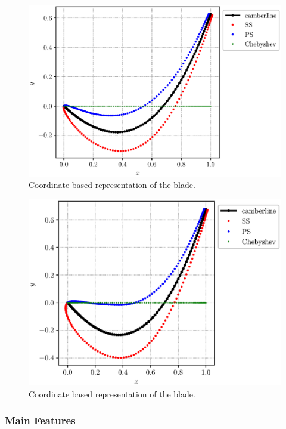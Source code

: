 \begin{figure}[H]
  \centering
  \includegraphics[scale=0.5]{pyFigure/figures/coordinate1.eps}
  \caption{Coordinate based representation of the blade.}
  \label{fig:bladeNodes}
\end{figure}

\begin{figure}[H]
  \centering
  \includegraphics[scale=0.5]{pyFigure/figures/coordinate2.eps}
  \caption{Coordinate based representation of the blade.}
  \label{fig:bladeNodes1}
\end{figure}

\subsubsection{Main Features}

